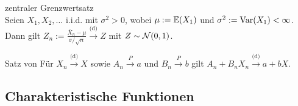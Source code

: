 \begin{Def}{zentraler Grenzwertsatz}\\
    Seien $X_1, X_2, \dotsc$ i.i.d. mit $\sigma^2 > 0$,
    wobei $\mu := \mathbb{E}(X_1)$ und $\sigma^2 := \mathrm{Var}(X_1) < \infty$.\\
    Dann gilt $Z_n := \frac{\overline{X}_n - \mu}{\sigma/\sqrt{n}}
    \xrightarrow{\text{(d)}} Z$ mit $Z \sim \mathcal{N}(0, 1)$.
\end{Def}

\begin{Def}{Satz von }
    Für $X_n \xrightarrow{\text{(d)}} X$ sowie $A_n \xrightarrow{P} a$ und
    $B_n \xrightarrow{P} b$ gilt $A_n + B_n X_n \xrightarrow{\text{(d)}} a + bX$.
\end{Def}

\subsection{%
    Charakteristische Funktionen%
}

